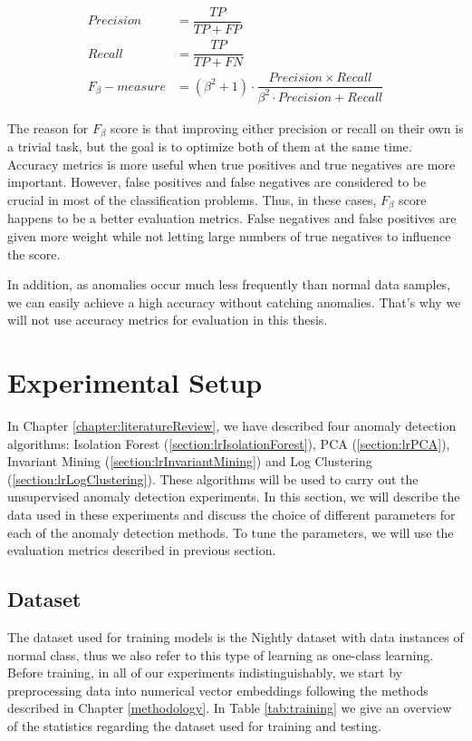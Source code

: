 \begin{align}
    Precision &= \dfrac{TP}{TP + FP} \\
    Recall &= \dfrac{TP}{TP + FN} \\
    F_{\beta}-measure &= (\beta^2 + 1) \cdot \dfrac{Precision \times Recall }{\beta^2 \cdot Precision + Recall} 
\end{align}

The reason for $F_{\beta}$ score is that improving either precision or recall on their own is a trivial task, but the goal is to optimize both of them at the same time. Accuracy metrics is more useful when true positives and true negatives are more important. However, false positives and false negatives are considered to be crucial in most of the classification problems. Thus, in these cases, $F_{\beta}$ score happens to be a better evaluation metrics. False negatives and false positives are given more weight while not letting large numbers of true negatives to influence the score.

In addition, as anomalies occur much less frequently than normal data samples, we can easily achieve a high accuracy without catching anomalies. That's why we will not use accuracy metrics for evaluation in this thesis.


\section{Experimental Setup}
\label{section:experimental-setup}
In Chapter \ref{chapter:literatureReview}, we have described four anomaly detection algorithms: Isolation Forest (\ref{section:lrIsolationForest}), PCA (\ref{section:lrPCA}), Invariant Mining (\ref{section:lrInvariantMining}) and Log Clustering (\ref{section:lrLogClustering}). These algorithms will be used to carry out the unsupervised anomaly detection experiments. In this section, we will describe the data used in these experiments and discuss the choice of different parameters for each of the anomaly detection methods. To tune the parameters, we will use the evaluation metrics described in previous section.

\subsection{Dataset}
The dataset used for training models is the Nightly dataset with data instances of normal class, thus we also refer to this type of learning as one-class learning. Before training, in all of our experiments indistinguishably, we start by preprocessing data into numerical vector embeddings following the methods described in Chapter \ref{methodology}. In Table \ref{tab:training} we give an overview of the statistics regarding the dataset used for training and testing.

